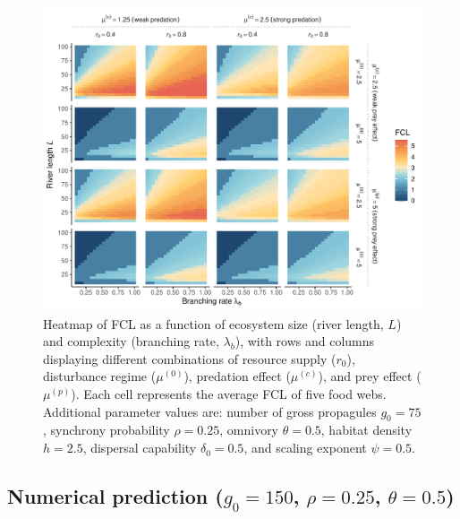 \begin{figure}
\centering
\includegraphics{../data_fmt/fig_rho025_g75_theta05.pdf}
\caption{Heatmap of FCL as a function of ecosystem size (river length,
\(L\)) and complexity (branching rate, \(\lambda_b\)), with rows and
columns displaying different combinations of resource supply (\(r_0\)),
disturbance regime (\(\mu^{(0)}\)), predation effect (\(\mu^{(c)}\)),
and prey effect (\(\mu^{(p)}\)). Each cell represents the average FCL of
five food webs. Additional parameter values are: number of gross
propagules \(g_0=75\), synchrony probability \(\rho=0.25\), omnivory
\(\theta=0.5\), habitat density \(h=2.5\), dispersal capability
\(\delta_0=0.5\), and scaling exponent \(\psi=0.5\).}
\end{figure}

\newpage

\subsection{\texorpdfstring{Numerical prediction (\(g_0=150\),
\(\rho=0.25\),
\(\theta=0.5\))}{Numerical prediction (g\_0=150, \textbackslash rho=0.25, \textbackslash theta=0.5)}}\label{numerical-prediction-g_0150-rho0.25-theta0.5}


